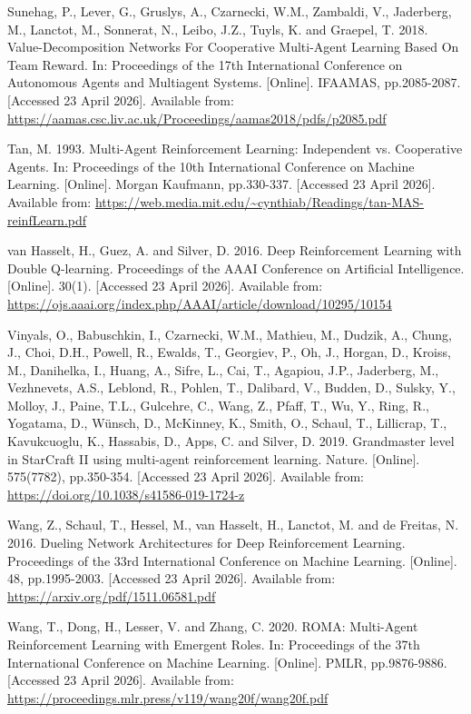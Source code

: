 Sunehag, P., Lever, G., Gruslys, A., Czarnecki, W.M., Zambaldi, V., Jaderberg, M., Lanctot, M., Sonnerat, N., Leibo, J.Z., Tuyls, K. and Graepel, T. 2018. Value-Decomposition Networks For Cooperative Multi-Agent Learning Based On Team Reward. In: Proceedings of the 17th International Conference on Autonomous Agents and Multiagent Systems. [Online]. IFAAMAS, pp.2085-2087. [Accessed 23 April 2026]. Available from: \url{https://aamas.csc.liv.ac.uk/Proceedings/aamas2018/pdfs/p2085.pdf}

Tan, M. 1993. Multi-Agent Reinforcement Learning: Independent vs. Cooperative Agents. In: Proceedings of the 10th International Conference on Machine Learning. [Online]. Morgan Kaufmann, pp.330-337. [Accessed 23 April 2026]. Available from: \url{https://web.media.mit.edu/~cynthiab/Readings/tan-MAS-reinfLearn.pdf}

van Hasselt, H., Guez, A. and Silver, D. 2016. Deep Reinforcement Learning with Double Q-learning. Proceedings of the AAAI Conference on Artificial Intelligence. [Online]. 30(1). [Accessed 23 April 2026]. Available from: \url{https://ojs.aaai.org/index.php/AAAI/article/download/10295/10154}

Vinyals, O., Babuschkin, I., Czarnecki, W.M., Mathieu, M., Dudzik, A., Chung, J., Choi, D.H., Powell, R., Ewalds, T., Georgiev, P., Oh, J., Horgan, D., Kroiss, M., Danihelka, I., Huang, A., Sifre, L., Cai, T., Agapiou, J.P., Jaderberg, M., Vezhnevets, A.S., Leblond, R., Pohlen, T., Dalibard, V., Budden, D., Sulsky, Y., Molloy, J., Paine, T.L., Gulcehre, C., Wang, Z., Pfaff, T., Wu, Y., Ring, R., Yogatama, D., W{\"u}nsch, D., McKinney, K., Smith, O., Schaul, T., Lillicrap, T., Kavukcuoglu, K., Hassabis, D., Apps, C. and Silver, D. 2019. Grandmaster level in {StarCraft II} using multi-agent reinforcement learning. Nature. [Online]. 575(7782), pp.350-354. [Accessed 23 April 2026]. Available from: \url{https://doi.org/10.1038/s41586-019-1724-z}

Wang, Z., Schaul, T., Hessel, M., van Hasselt, H., Lanctot, M. and de Freitas, N. 2016. Dueling Network Architectures for Deep Reinforcement Learning. Proceedings of the 33rd International Conference on Machine Learning. [Online]. 48, pp.1995-2003. [Accessed 23 April 2026]. Available from: \url{https://arxiv.org/pdf/1511.06581.pdf}

Wang, T., Dong, H., Lesser, V. and Zhang, C. 2020. {ROMA}: Multi-Agent Reinforcement Learning with Emergent Roles. In: Proceedings of the 37th International Conference on Machine Learning. [Online]. PMLR, pp.9876-9886. [Accessed 23 April 2026]. Available from: \url{https://proceedings.mlr.press/v119/wang20f/wang20f.pdf}

